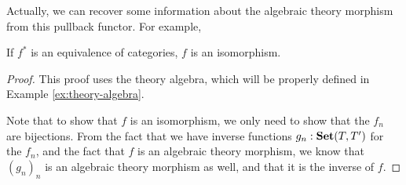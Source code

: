 Actually, we can recover some information about the algebraic theory morphism from this pullback functor. For example,
\begin{lemma}\label{lem:algebra-pullback-equivalence}
  If $ f^* $ is an equivalence of categories, $ f $ is an isomorphism.
\end{lemma}
\begin{proof}
  This proof uses the theory algebra, which will be properly defined in Example \ref{ex:theory-algebra}.

  Note that to show that $ f $ is an isomorphism, we only need to show that the $ f_n $ are bijections. From the fact that we have inverse functions $ g_n : \mathbf{Set}(T, T^\prime) $ for the $ f_n $, and the fact that $ f $ is an algebraic theory morphism, we know that $ (g_n)_n $ is an algebraic theory morphism as well, and that it is the inverse of $ f $.


\end{proof}
